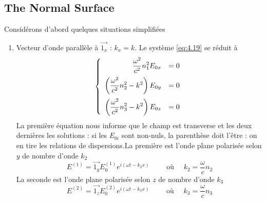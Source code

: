 \subsection{The Normal Surface}
Considérons d'abord quelques situations simplifiées
\begin{enumerate}
\item Vecteur d'onde parallèle à $\vec{1_x}$ : $k_x=k$. Le système \eqref{eq:4.19} se réduit à 
\begin{equation}
\left\{\begin{array}{rl}
\DS\frac{\omega^ 2}{c^2}n_1^2 E_{0x} &= 0\vspace{2mm}\\
\DS\left(\frac{\omega^2}{c^2}n_2^2-k^2\right)E_{0y}&=0\vspace{2mm}\\
\DS\left(\frac{\omega^2}{c^2}n_3^2-k^2\right)E_{0z}&=0
\end{array}\right.
\end{equation}
La première équation nous informe que le champ est transverse et les deux dernières les solutions : si les $E_{0i}$
sont non-nuls, la parenthèse doit l'être : on en tire les relations de dispersions.La première est l'onde plane
polarisée selon $y$ de nombre d'onde $k_2$
\begin{equation}
E^{(1)} = \vec{1_y}E_0^{(1)}e^{i(\omega t-k_2x)}\qquad\text{ où }\quad k_2 = \frac{\omega}{c}n_2
\end{equation}
La seconde est l'onde plane polarisée selon $z$ de nombre d'onde $k_3$
\begin{equation}
E^{(2)} = \vec{1_z}E_0^{(2)}e^{i(\omega t-k_3x)}\qquad\text{ où }\quad k_3 = \frac{\omega}{c}n_3
\end{equation}
\end{enumerate}





